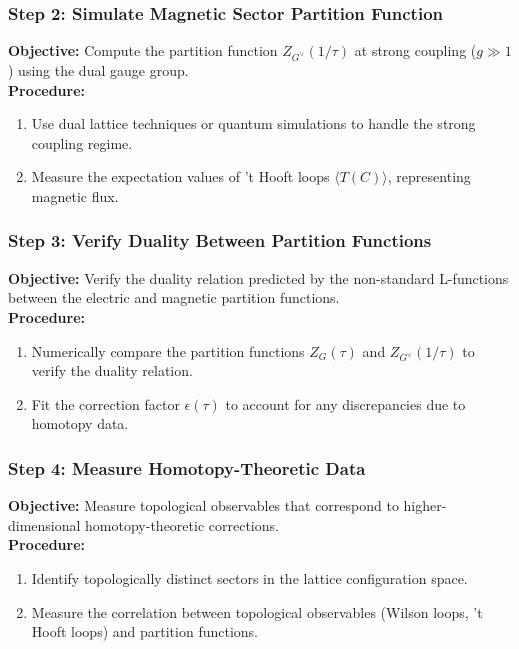 \documentclass{article}
\theoremstyle{remark}
\begin{document}
\subsubsection{Step 2: Simulate Magnetic Sector Partition Function}
\textbf{Objective:} Compute the partition function $ Z_{G^\vee}(1/\tau) $ at strong coupling ($ g \gg 1 $) using the dual gauge group.\\
\textbf{Procedure:}
\begin{enumerate}
    \item Use dual lattice techniques or quantum simulations to handle the strong coupling regime.
    \item Measure the expectation values of 't Hooft loops $ \langle T(C) \rangle $, representing magnetic flux.
\end{enumerate}

\subsubsection{Step 3: Verify Duality Between Partition Functions}
\textbf{Objective:} Verify the duality relation predicted by the non-standard L-functions between the electric and magnetic partition functions.\\
\textbf{Procedure:}
\begin{enumerate}
    \item Numerically compare the partition functions $ Z_G(\tau) $ and $ Z_{G^\vee}(1/\tau) $ to verify the duality relation.
    \item Fit the correction factor $ \epsilon(\tau) $ to account for any discrepancies due to homotopy data.
\end{enumerate}

\subsubsection{Step 4: Measure Homotopy-Theoretic Data}
\textbf{Objective:} Measure topological observables that correspond to higher-dimensional homotopy-theoretic corrections.\\
\textbf{Procedure:}
\begin{enumerate}
    \item Identify topologically distinct sectors in the lattice configuration space.
    \item Measure the correlation between topological observables (Wilson loops, 't Hooft loops) and partition functions.
\end{enumerate}
\end{document}
